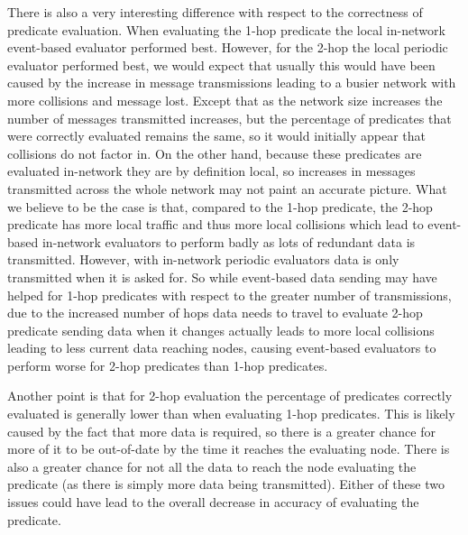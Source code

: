 There is also a very interesting difference with respect to the correctness of predicate evaluation. When evaluating the 1-hop predicate the local in-network event-based evaluator performed best. However, for the 2-hop the local periodic evaluator performed best, we would expect that usually this would have been caused by the increase in message transmissions leading to a busier network with more collisions and message lost. Except that as the network size increases the number of messages transmitted increases, but the percentage of predicates that were correctly evaluated remains the same, so it would initially appear that collisions do not factor in. On the other hand, because these predicates are evaluated in-network they are by definition local, so increases in messages transmitted across the whole network may not paint an accurate picture. What we believe to be the case is that, compared to the 1-hop predicate, the 2-hop predicate has more local traffic and thus more local collisions which lead to event-based in-network evaluators to perform badly as lots of redundant data is transmitted. However, with in-network periodic evaluators data is only transmitted when it is asked for. So while event-based data sending may have helped for 1-hop predicates with respect to the greater number of transmissions, due to the increased number of hops data needs to travel to evaluate 2-hop predicate sending data when it changes actually leads to more local collisions leading to less current data reaching nodes, causing event-based evaluators to perform worse for 2-hop predicates than 1-hop predicates.

Another point is that for 2-hop evaluation the percentage of predicates correctly evaluated is generally lower than when evaluating 1-hop predicates. This is likely caused by the fact that more data is required, so there is a greater chance for more of it to be out-of-date by the time it reaches the evaluating node. There is also a greater chance for not all the data to reach the node evaluating the predicate (as there is simply more data being transmitted). Either of these two issues could have lead to the overall decrease in accuracy of evaluating the predicate.

